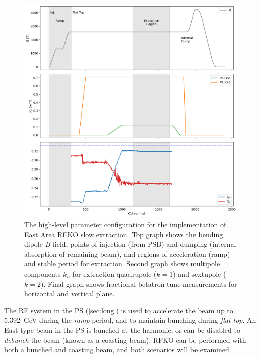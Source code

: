 \documentclass[11pt]{report}
\begin{document}
\begin{figure}[h]
  \centering
  \includegraphics[width=\linewidth]{cyclegraphs.png}
  \caption{The high-level parameter configuration for the implementation of East Area RFKO slow extraction. Top graph shows the bending dipole $B$ field, points of injection (from PSB) and dumping (internal absorption of remaining beam), and regions of acceleration (ramp) and stable period for extraction. Second graph shows multipole components $k_n$ for extraction quadrupole ($k=1$) and sextupole ($k=2$). Final graph shows fractional betatron tune measurements for horizontal and vertical plane.}\label{fig:cycle}
\end{figure}

The RF system in the PS (\autoref{sec:long}) is used to accelerate the beam up to \qty{5.392}{\giga\electronvolt} during the \textit{ramp} period, and to maintain bunching during \textit{flat-top}. An East-type beam in the PS is bunched at the  harmonic, or can be disabled to \textit{debunch} the beam (known as a coasting beam). RFKO can be performed with both a bunched and coasting beam, and both scenarios will be examined.
\end{document}
